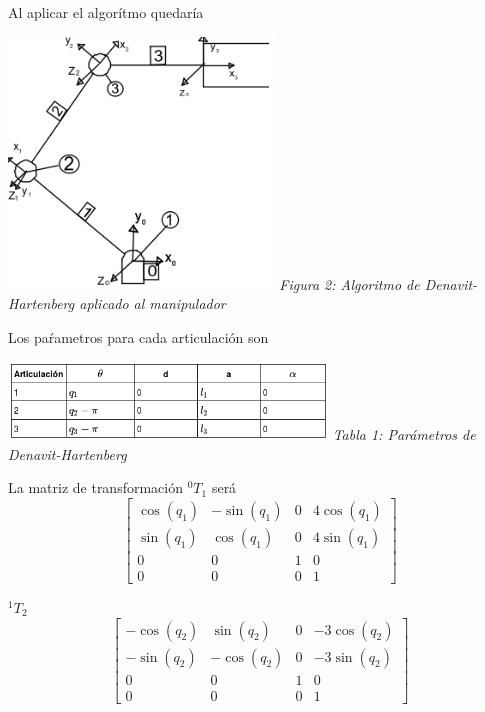 \documentclass[twoside]{article}
\begin{document}
\begin{multicols}{2}
Al aplicar el algorítmo quedaría
\begin{center}
 \includegraphics[width=200pt,keepaspectratio=true]{./RobotDH5.png}
  \textit{Figura 2: Algoritmo de Denavit-Hartenberg aplicado al manipulador}
\end{center}
Los paŕametros para cada articulación son

\begin{center}
 \includegraphics[width=240pt,keepaspectratio=true]{./Tabla_DH.png}
  \textit{Tabla 1: Parámetros de Denavit-Hartenberg}
\end{center}

La matriz de transformación \(^{0}T_{1}\) será
\begin{equation}
 \left[\begin{matrix}\cos{\left (q_{1} \right )} & - \sin{\left (q_{1} \right )} & 0 & 4 \cos{\left (q_{1} \right )}\\\sin{\left (q_{1} \right )} & \cos{\left (q_{1} \right )} & 0 & 4 \sin{\left (q_{1} \right )}\\0 & 0 & 1 & 0\\0 & 0 & 0 & 1\end{matrix}\right]
\end{equation} 

$^{1}T_{2}$
\begin{equation}
 \left[\begin{matrix}- \cos{\left (q_{2} \right )} & \sin{\left (q_{2} \right )} & 0 & - 3 \cos{\left (q_{2} \right )}\\- \sin{\left (q_{2} \right )} & - \cos{\left (q_{2} \right )} & 0 & - 3 \sin{\left (q_{2} \right )}\\0 & 0 & 1 & 0\\0 & 0 & 0 & 1\end{matrix}\right]
\end{equation}


\end{multicols}
\end{document}
